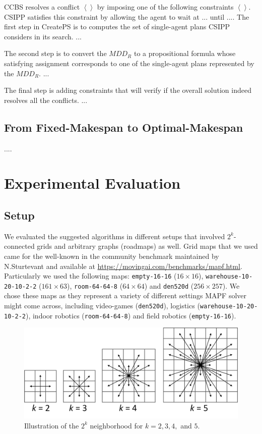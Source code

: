 \documentclass[review]{elsarticle}
\newcommand{\tuple}[1]{\ensuremath{\left \langle #1 \right \rangle }}
\newcommand{\mddr}{\ensuremath{MDD_R}\xspace}
\newcommand{\ccbs}{\ac{CCBS}\xspace}
\newcommand{\csipp}{\ac{CSIPP}\xspace}
\newcommand{\mapf}{\ac{MAPF}\xspace}
\begin{document}
\ccbs resolves a conflict $\tuple{}$ by imposing one of the following constraints $\tuple{}$. 
\csipp satisfies this constraint by allowing the agent to wait at ... until .... 
The first step in CreatePS is to computes the set of single-agent plans \csipp considers in its search. 
...

The second step is to convert the \mddr to a propositional formula whose satisfying assignment corresponds to one of the single-agent plans 
represented by the \mddr. 
...

The final step is adding constraints that will verify if the overall solution indeed resolves all the conflicts. 
...


\subsection{From Fixed-Makespan to Optimal-Makespan}
....



\section{Experimental Evaluation}
\subsection{Setup}
We evaluated the suggested algorithms in different setups that involved $2^k$-connected grids \cite{rivera2017grid} and arbitrary graphs (roadmaps) as well. Grid maps that we used came for the well-known in the community benchmark maintained by N.Sturtevant \cite{stern2019mapf} and available at \url{https://movingai.com/benchmarks/mapf.html}. Particularly we used the following maps: \texttt{empty-16-16} ($16 \times 16$), \texttt{warehouse-10-20-10-2-2} ($161 \times 63$), \texttt{room-64-64-8} ($64 \times 64$) and \texttt{den520d} ($256 \times 257$). We chose these maps as they represent a variety of different settings \mapf solver might come across, including video-games (\texttt{den520d}), logistics (\texttt{warehouse-10-20-10-2-2}), indoor robotics (\texttt{room-64-64-8}) and field robotics (\texttt{empty-16-16}).

\begin{figure}
\centering
    \centering
    \includegraphics[width=0.75\columnwidth]{2k-neighborhood.png}
    \caption{Illustration of the $2^k$ neighborhood for $k=2,3,4,$ and $5$.}
    \label{fig:2k-grids}
\end{figure}
\end{document}
